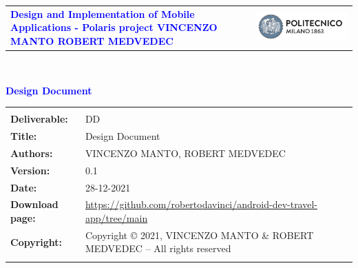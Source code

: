 




\begin{titlepage}



{\begin{table}[t!]
\centering
\begin{tabu} to \textwidth { X[1.3,r,p] X[1.7,l,p] }
\textcolor{Blue}
{\textbf{\small{Design and Implementation of Mobile Applications  - Polaris project VINCENZO MANTO ROBERT MEDVEDEC}}} & \includegraphics[scale=0.5]{Images/PolimiLogo}
\end{tabu}
\end{table}}~\\ [7cm]


\begin{flushleft}

{\textcolor{Blue}{\textbf{\Huge{Design Document}}}} \\ [1cm]

\end{flushleft}

\end{titlepage}

\begin{table}[h!]
\begin{tabu} to \textwidth { X[0.3,r,p] X[0.7,l,p] }
\hline
\\
\textbf{Deliverable:} & DD\\
\textbf{Title:} & Design Document \\
\textbf{Authors:} & VINCENZO MANTO, ROBERT MEDVEDEC \\
\textbf{Version:} & 0.1 \\ 
\textbf{Date:} & 28-12-2021 \\
\textbf{Download page:} & \url{https://github.com/robertodavinci/android-dev-travel-app/tree/main} \\
\textbf{Copyright:} & Copyright © 2021, VINCENZO MANTO \& ROBERT MEDVEDEC – All rights reserved \\
\\
\hline
\end{tabu}
\end{table}




